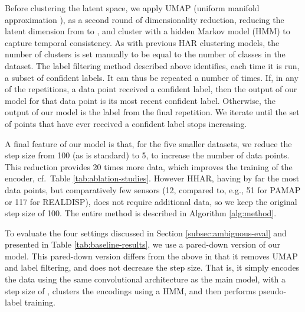 \documentclass[wcp]{jmlr}
\begin{document}
Before clustering the latent space, we apply UMAP (uniform manifold approximation \citep{mcinnes2018umap}), as a second round of dimensionality reduction, reducing the latent dimension from  to , and cluster with a hidden Markov model (HMM) to capture temporal consistency. As with previous HAR clustering models, the number of clusters is set manually to be equal to the number of classes in the dataset.
 The label filtering method described above identifies, each time it is run, a subset of confident labels. It can thus be repeated a number of times. If, in any of the repetitions, a data point received a confident label, then the output of our model for that data point is its most recent confident label. Otherwise, the output of our model is the label from the final repetition. We iterate until the set of points that have ever received a confident label stops increasing.
 
 A final feature of our model is that, for the five smaller datasets, we reduce the step size from 100 (as is standard) to 5, to increase the number of data points. This reduction provides 20 times more data, which improves the training of the encoder, cf.\ Table \ref{tab:ablation-studies}. However HHAR, having by far the most data points, but comparatively few sensors (12, compared to, e.g., 51 for PAMAP or 117 for REALDISP), does not require additional data, so we keep the original step size of 100. The entire method is described in Algorithm \ref{alg:method}.

To evaluate the four settings discussed in Section \ref{subsec:ambiguous-eval} and presented in Table \ref{tab:baseline-results}, we use a pared-down version of our model. This pared-down version differs from the  above in that it removes UMAP and label filtering, and does not decrease the step size. That is, it simply encodes the data using the same convolutional architecture as the main model, with a step size of , clusters the encodings using a HMM, and then performs pseudo-label training.
 
\end{document}
